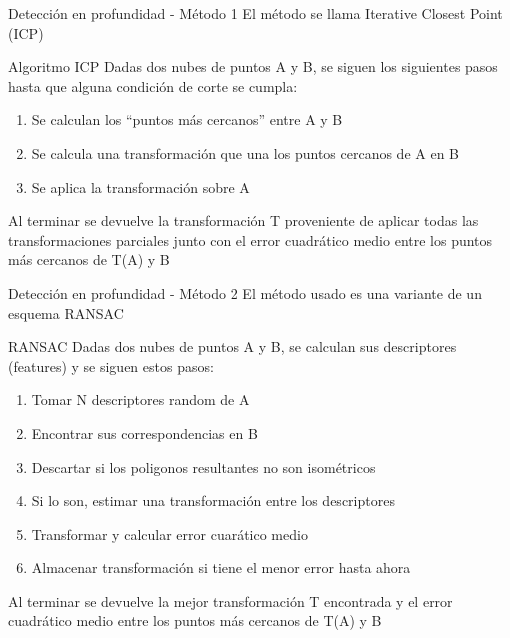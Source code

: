\documentclass[]{beamer}
\begin{document}
\begin{frame}[t]{Detección en profundidad - Método 1}
    El método se llama Iterative Closest Point (ICP)
    \begin{block}{Algoritmo ICP}
        Dadas dos nubes de puntos A y B, se siguen los siguientes pasos hasta que alguna condición de corte se cumpla:
        \begin{enumerate}
            \item Se calculan los ``puntos más cercanos'' entre A y B
            \item Se calcula una transformación que una los puntos cercanos de A en B
            \item Se aplica la transformación sobre A
        \end{enumerate}
        Al terminar se devuelve la transformación T proveniente de aplicar todas las transformaciones parciales junto con el error cuadrático medio entre los puntos más cercanos de T(A) y B
    \end{block}
\end{frame}



\begin{frame}[t]{Detección en profundidad - Método 2}
    El método usado es una variante de un esquema RANSAC
    \begin{block}{RANSAC}
        Dadas dos nubes de puntos A y B, se calculan sus descriptores (features) y se siguen estos pasos:
        \begin{enumerate}
            \item Tomar N descriptores random de A
            \item Encontrar sus correspondencias en B
            \item Descartar si los poligonos resultantes no son isométricos
            \item Si lo son, estimar una transformación entre los descriptores
            \item Transformar y calcular error cuarático medio
            \item Almacenar transformación si tiene el menor error hasta ahora
        \end{enumerate}
        Al terminar se devuelve la mejor transformación T encontrada y el error cuadrático medio entre los puntos más cercanos de T(A) y B
    \end{block}
\end{frame}
\end{document}

